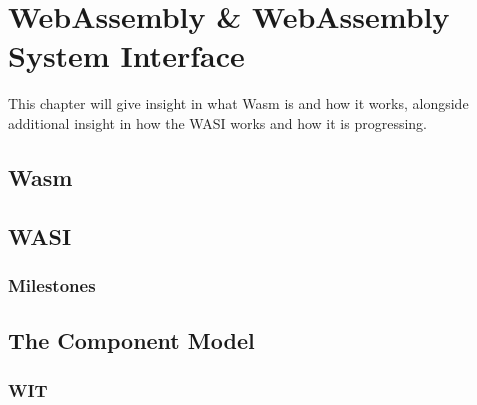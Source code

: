 \chapter{WebAssembly {\&} WebAssembly System Interface}
This chapter will give insight in what \acrfull{Wasm} is and how it works, alongside additional insight in how the \acrfull{WASI} works and how it is progressing.

\section{\acrshort{Wasm}}

\section{\acrshort{WASI}}

\subsection{Milestones}

\section{The Component Model}

\subsection{\acrshort{WIT}}
